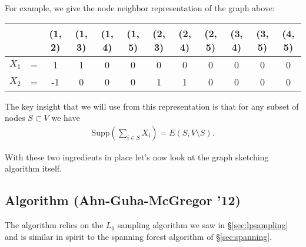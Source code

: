 \documentclass[11pt]{article}
\begin{document}
\begin{figure}[htb]
  \centering
\end{figure}

For example, we give the node neighbor representation of the graph above:

\begin{tabular}{cccccccccccc}
  \toprule
  & & (1, 2) & (1, 3) & (1, 4) & (1, 5) & (2, 3) & (2, 4) & (2, 5) & (3, 4) & (3, 5) & (4, 5)\\
  \midrule
  $X_1$ & = & 1 & 1 & 0 & 0 & 0 & 0 & 0 & 0 & 0 & 0\\
  $X_2$ & = & -1 & 0 & 0 & 0 & 1 & 1 & 0 & 0 & 0 & 0\\
  \bottomrule
\end{tabular}

The key insight that we will use from this representation is that for any subset of nodes $S \subset V$ we have
\begin{align*}
  \text{Supp}\left(\sum_{i \in S} X_i\right) = E(S, V \setminus S).
\end{align*}

With these two ingredients in place let's now look at the graph sketching algorithm itself.

\subsection{Algorithm (Ahn-Guha-McGregor '12)}

The algorithm relies on the $L_0$ sampling algorithm we saw in \S\ref{sec:lpsampling} and is similar in spirit to the spanning forest algorithm of \S\ref{sec:spanning}.
\end{document}
